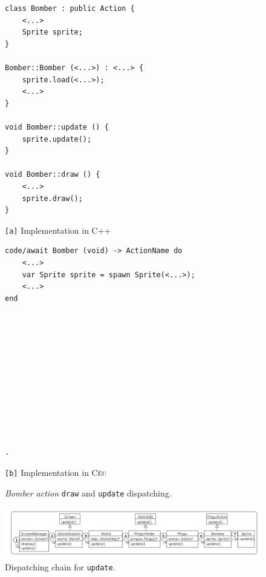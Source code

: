 \documentclass[times,twocolumn,final]{elsarticle}
\newcommand{\CEU}{\textsc{C\'{e}u}\xspace}
\newcommand{\code}[1] {{\small{\texttt{#1}}}}
\newcommand{\ax}{\code{[a]}\xspace}
\newcommand{\bx}{\code{[b]}\xspace}
\begin{document}
\begin{figure}
\begin{minipage}[t]{0.50\linewidth}
\begin{lstlisting}[numbers=right]
class Bomber : public Action {
    <...>
    Sprite sprite;
}

Bomber::Bomber (<...>) : <...> {
    sprite.load(<...>);
    <...>
}

void Bomber::update () {
    sprite.update();
}

void Bomber::draw () {
    <...>
    sprite.draw();
}
\end{lstlisting}
\centering\small{\ax Implementation in C++}
\end{minipage}
%
\begin{minipage}[t]{0.50\linewidth}
\begin{lstlisting}[xleftmargin=2em]
code/await Bomber (void) -> ActionName do
    <...>
    var Sprite sprite = spawn Sprite(<...>);
    <...>
end












.
\end{lstlisting}
\centering\small{\bx Implementation in \CEU}
\end{minipage}
\caption{ \emph{Bomber action} \code{draw} and \code{update} dispatching.
\label{lst.hier}
}
\end{figure}

\begin{figure}
\centering
\includegraphics[width=\textwidth]{hierarchy}
\caption{Dispatching chain for \code{update}.
\label{fig.hier}
}
\end{figure}
\end{document}
